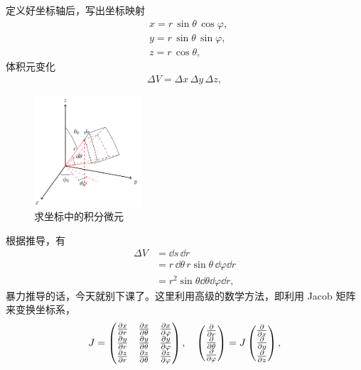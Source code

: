 定义好坐标轴后，写出坐标映射
\begin{align}
    & x= r\,\sin\theta \, \cos\varphi, \\
    & y = r\,\sin\theta \, \sin\varphi, \\
    & z = r\,\cos\theta,
\end{align}
体积元变化
\begin{align}
    \Delta V = \Delta x \,\Delta y\, \Delta z,
\end{align}
\begin{figure}[tbp]
    \centering
    \includegraphics[width=4cm]{fig/3d_int_element.png}
    \caption{求坐标中的积分微元}
\end{figure}
根据推导，有
\begin{align}
    \Delta V & =\dd s \, \dd r \\
    & = r \, \dd\theta \, r\sin\theta \, \dd\varphi \dd r \\
    & = r^2 \sin\theta \dd\theta \dd\varphi \dd r,
\end{align}
暴力推导的话，今天就别下课了。这里利用高级的数学方法，即利用 Jacob 矩阵来变换坐标系，
\begin{align}
    J = 
    \begin{pmatrix}
    \pdv{x}{r} & \pdv{x}{\theta} & \pdv{x}{\varphi} \\
    \pdv{y}{r} & \pdv{y}{\theta} & \pdv{y}{\varphi} \\
    \pdv{z}{r} & \pdv{z}{\theta} & \pdv{z}{\varphi}
    \end{pmatrix}, \quad 
    \begin{pmatrix}
        \pdv{r} \\ \pdv{\theta} \\ \pdv{\varphi}
    \end{pmatrix}
    = J 
    \begin{pmatrix}
        \pdv{x} \\ \pdv{y} \\ \pdv{z}
    \end{pmatrix},
\end{align}
